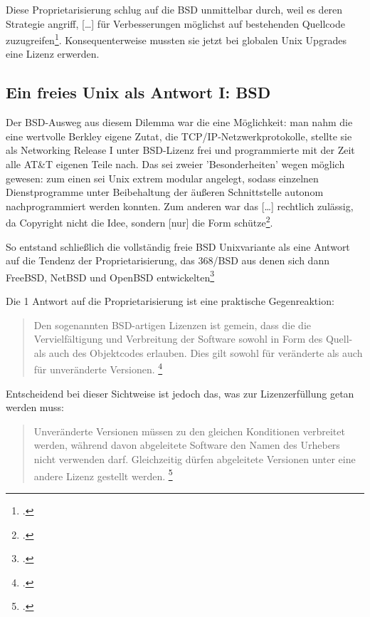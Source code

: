 \documentclass[DIV=calc,BCOR=5mm,11pt,headings=small,oneside,abstract=true, toc=bib]{scrartcl}
\begin{document}
Diese Proprietarisierung schlug auf die BSD unmittelbar durch, weil es deren
Strategie angriff, \glqq{}[\ldots] für Verbesserungen möglichst auf
bestehenden Quellcode zuzugreifen\grqq{}\footcite[vgl.][106]{Eckl2004a}.
Konsequenterweise mussten sie jetzt bei globalen Unix Upgrades eine Lizenz
erwerden.

\subsection{Ein freies Unix als Antwort I: BSD}

Der BSD-Ausweg aus diesem Dilemma war die eine Möglichkeit: man nahm die eine
wertvolle Berkley eigene Zutat, die \glqq{}TCP/IP-Netzwerkprotokolle\grqq{},
stellte sie als \glqq{}Networking Release I\grqq{} unter BSD-Lizenz frei und
programmierte mit der Zeit alle AT\&T eigenen Teile nach. Das sei zweier
'Besonderheiten' wegen möglich gewesen: zum einen sei Unix extrem modular
angelegt, sodass einzelnen Dienstprogramme unter Beibehaltung der äußeren
Schnittstelle autonom nachprogrammiert werden konnten. Zum anderen war das
\glqq{}[\ldots] rechtlich zulässig, da Copyright nicht die Idee, sondern
[nur] die Form schütze\grqq{}\footcite[vgl.][107]{Eckl2004a}.

So entstand schließlich die vollständig freie BSD Unixvariante als eine Antwort
auf die Tendenz der Proprietarisierung, das 368/BSD aus denen sich dann FreeBSD,
NetBSD und OpenBSD entwickelten\footcite[vgl.][107]{Eckl2004a}

Die 1 Antwort auf die Proprietarisierung ist eine praktische Gegenreaktion: 

\begin{quote}
\glqq{}Den sogenannten BSD-artigen Lizenzen ist gemein, dass die die
Vervielfältigung und Verbreitung der Software sowohl in Form des Quell- als auch
des Objektcodes erlauben. Dies gilt sowohl für veränderte als auch für
unveränderte Versionen.
\grqq{}\footcite[][108]{Eckl2004a}
\end{quote}

Entscheidend bei dieser Sichtweise ist jedoch das, was zur Lizenzerfüllung getan
werden muss:

\begin{quote}
\glqq{}Unveränderte Versionen müssen zu den gleichen Konditionen verbreitet
werden, während davon abgeleitete Software den Namen des Urhebers nicht
verwenden darf. Gleichzeitig dürfen abgeleitete Versionen unter eine andere
Lizenz gestellt werden.
\grqq{}\footcite[][108]{Eckl2004a}
\end{quote}
\end{document}
